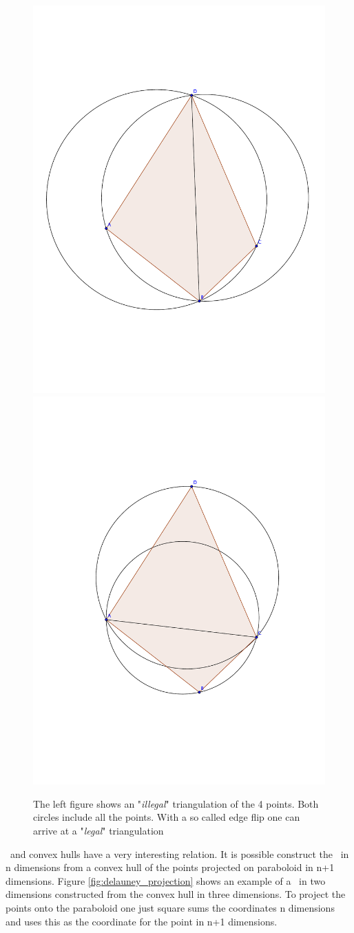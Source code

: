 \begin{figure}[htbp] %
   \centering
   \includegraphics[width=.45\textwidth]{chapter_ndinterp/plots/illegal_triangulation.pdf} 
   \includegraphics[width=.45\textwidth]{chapter_ndinterp/plots/edge_flip.pdf} 
   \caption{The left figure shows an "\textit{illegal}" triangulation of the 4 points. Both circles include all the points. With a so called edge flip one can arrive at a "\textit{legal}" triangulation}
   \label{fig:delauney_allowed}
\end{figure}
\deltri\ and convex hulls have a very interesting relation. It is possible construct the \deltri\ in n dimensions from a convex hull of the points projected on paraboloid in n+1 dimensions.
Figure \ref{fig:delauney_projection} shows an example of a \deltri\ in two dimensions constructed from the convex hull in three dimensions. To project the points onto the paraboloid one just square sums the coordinates n dimensions and uses this as the coordinate for the point in n+1 dimensions. 


